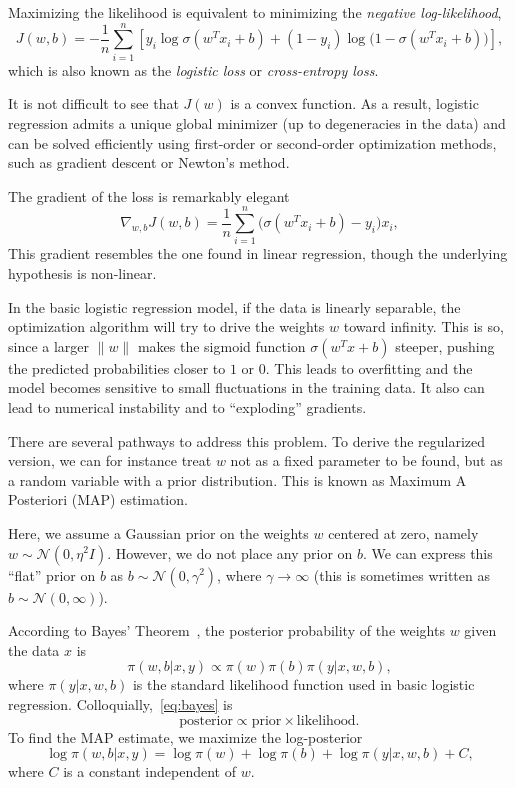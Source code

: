 Maximizing the likelihood is equivalent to minimizing the {\em negative log-likelihood}, 
$$
J(w,b) = - \frac{1}{n} \sum_{i=1}^n
[y_i \log \sigma( w^T x_i + b) + (1-y_i)\log\bigl(1-\sigma( w^T x_i + b)\bigr)],
$$
which is also known as the \emph{logistic loss} or \emph{cross-entropy loss}.


It is not difficult to see that $J(w)$ is a convex function.
As a result, logistic regression admits a unique global minimizer (up to degeneracies in the data) and can be solved efficiently using first-order or second-order optimization methods, such as gradient descent or Newton’s method.


The gradient of the loss  is remarkably elegant
$$
\nabla_{w,b} J(w,b) =
\frac{1}{n}\sum_{i=1}^n
\bigl(\sigma(w^T x_i + b) - y_i\bigr)x_i,
$$
This gradient resembles the one found in linear regression, though the underlying hypothesis is non-linear.



In the basic logistic regression model,  if the data is linearly separable, the optimization algorithm will try to drive the weights $w$ toward infinity.
This is so, since a larger $\|w\|$ makes the sigmoid function $\sigma(w^T x + b)$ steeper, pushing the predicted probabilities closer to  $1$ or $0$. This leads to overfitting and the model becomes  sensitive to small fluctuations in the training data.
It also can lead to numerical instability and to 
``exploding'' gradients.

There are several pathways to address this problem.
To derive the regularized version, we can for instance treat $w$ not as a fixed parameter to be found, but as a random variable with a prior distribution. This is known as Maximum A Posteriori (MAP) estimation.

Here, we assume a Gaussian prior on the weights $w$ centered at zero, namely $w \sim {\mathcal N}(0,\eta^2 I)$. However, we do not place any prior on $b$. We can express this ``flat'' prior on $b$ as
$b \sim {\mathcal N}(0,\gamma^2)$, where $\gamma \to \infty$ (this is sometimes written as
$b \sim {\mathcal N}(0,\infty)$).

According to Bayes’ Theorem~\cite[Chapter 7.2.3]{casella2024statistical}, the posterior probability of the weights $w$ given the data $x$ is
\begin{equation}\label{eq:bayes}
\pi(w,b | x, y)  \propto  \pi(w)\pi(b) \pi(y | x, w,b) ,
\end{equation}
where $\pi(y | x, w,b)$ is the standard likelihood function used in basic logistic regression.
Colloquially,~\eqref{eq:bayes} is 
$$\quad \,\, \text{posterior}  \propto \text{prior} \times \text{likelihood.}$$    
To find the MAP estimate, we maximize the log-posterior
$$\log \pi(w,b | x, y) =  \log \pi(w)+\log \pi(b) + \log \pi(y | x, w,b)  + C,$$
where $C$ is a constant independent of $w$.

